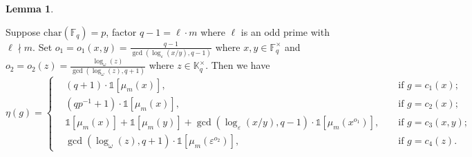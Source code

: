\documentclass[12pt, reqno]{amsart}
\theoremstyle{definition}
\newtheorem{lemma}[theorem]{Lemma}
\theoremstyle{remark}
\numberwithin{equation}{section}
\newcommand{\BF}{\mathbb{F}}
\newcommand{\BK}{\mathbb{K}}
\newcommand{\pt}[1]{\left(#1\right)}
\newcommand{\fk}[1]{\left[#1\right]}
\newcommand{\one}{\mathds{1}}
\begin{document}
\begin{lemma}\label{eta_lemma}
	
	Suppose $\mathrm{char}(\BF_q) = p$, factor $q - 1 = \ell \cdot m$ where $\ell$ is an odd prime with $\ell \nmid m$. Set $o_1 = o_1(x, y) = \frac{q - 1}{\gcd\pt{\log_\varepsilon(x/y), q - 1}}$ where $x, y \in \BF_q^\times$ and $o_2 = o_2(z) = \frac{\log_\omega(z)}{\gcd\pt{\log_\omega(z), q + 1}}$ where $z \in \BK_q^\times$. Then we have
	\[\eta(g) = \left\{\begin{aligned}
		&(q + 1)\cdot\one\fk{{\mu_{m}(x)}},&&\text{ if } g = c_1(x);\\
		&\pt{{q}{p^{-1}} + 1}\cdot\one\fk{{\mu_{m}(x)}}, &&\text{ if } g = c_2(x);\\
		&\one\fk{\mu_m(x)} + \one\fk{\mu_m(y)} + \gcd{(\log_\varepsilon\pt{{x}/{y}}, q - 1)}\cdot\one\fk{\mu_{m}(x^{o_1})},&&\text{ if } g = c_3(x, y);\\
		&\gcd(\log_\omega(z), q + 1)\cdot\one\fk{\mu_{m}\pt{\varepsilon^{o_2}}},&&\text{ if } g = c_4(z).
	\end{aligned}\right.\]	
	
\end{lemma}
\end{document}
